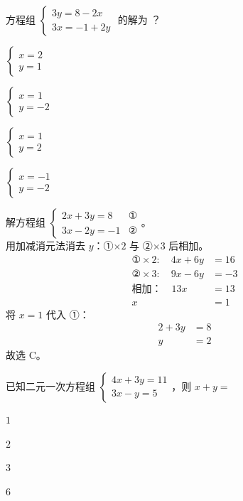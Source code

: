 \documentclass[12pt,a4paper,fontset=none]{exam-zh}
\begin{document}
\begin{question}
    方程组 $\begin{cases} 3y=8-2x \\ 3x=-1+2y \end{cases}$ 的解为 \paren[C]？
    \begin{choices}
        \item $\begin{cases} x=2 \\ y=1 \end{cases}$
        \item $\begin{cases} x=1 \\ y=-2 \end{cases}$
        \item $\begin{cases} x=1 \\ y=2 \end{cases}$
        \item $\begin{cases} x=-1 \\ y=-2 \end{cases}$
    \end{choices}
\end{question}

\begin{solution}
    解方程组 $\begin{cases} 2x+3y=8 & \text{①} \\ 3x-2y=-1 & \text{②} \end{cases}$。 \\
    用加减消元法消去 $y$：①$\times 2$ 与 ②$\times 3$ 后相加。
    \begin{align*}
        \text{①}\times 2:\quad 4x+6y &= 16 \\
        \text{②}\times 3:\quad 9x-6y &= -3 \\
        \text{相加：}\quad 13x &= 13 \\
        x &= 1
    \end{align*}
    将 $x=1$ 代入 ①：
    \begin{align*}
        2+3y &= 8 \\
        y &= 2
    \end{align*}
    故选 C。
\end{solution}

\begin{question}
    已知二元一次方程组 $\begin{cases} 4x+3y=11 \\ 3x-y=5 \end{cases}$，则 $x+y=$ \paren[C]
    \begin{choices}
        \item $1$
        \item $2$
        \item $3$
        \item $6$
    \end{choices}
\end{question}
\end{document}

